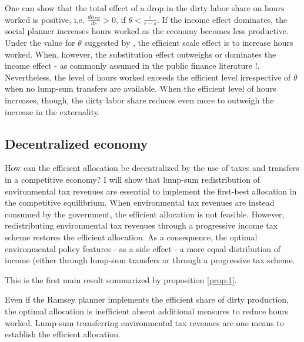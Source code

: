 One can show that the total effect of a drop in the dirty labor share on hours worked is positive, i.e. $\frac{dh_{FB}}{ds}>0$, if $\theta<\frac{\varepsilon}{\varepsilon-s}$. If the income effect dominates, the social planner increases hours worked as the economy becomes less productive. 
Under the value for $\theta$ suggested by \cite{Boppart2019LaborPerspectiveb}, the efficient scale effect is to increase hours worked. When, however, the substitution effect outweighs or dominates the income effect - as commonly assumed in the public finance literature \citep{Heathcote2017OptimalFramework, LansBovenberg1994EnvironmentalTaxation, LansBovenberg1996OptimalAnalyses} !.
Nevertheless, the level of hours worked exceeds the efficient level irrespective of $\theta$ when no lump-sum transfers are available. 
When the efficient level of hours increases, though, the dirty labor share reduces even more to outweigh the increase in the externality.

\subsection{Decentralized economy}

How can the efficient allocation be decentralized by the use of taxes and transfers in a competitive economy? %
I will show that lump-sum redistribution of environmental tax revenues are essential to implement the first-best allocation in the competitive equilibrium. 
When environmental tax revenues are instead consumed by the government, the efficient allocation is not feasible. 
However, redistributing environmental tax revenues through a progressive income tax scheme restores the efficient allocation. 
As a consequence, the optimal environmental policy features - as a side effect - a more equal distribution of income (either through lump-sum transfers or through a progressive tax scheme.%

This is the first main result summarized by proposition \ref{prop:1}. 

\begin{prop}\label{prop:1}
Even if the Ramsey planner implements the efficient share of dirty production, %
the optimal allocation is inefficient absent additional measures to reduce hours worked. Lump-sum transferring environmental tax revenues are one means to establish the efficient allocation. 
\end{prop}

